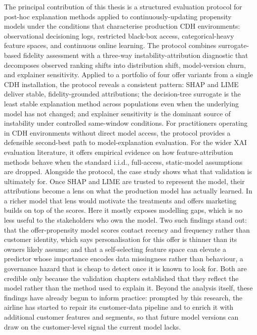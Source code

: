 \documentclass[oneside]{memoir} %
\begin{document}
The principal contribution of this thesis is a structured evaluation protocol for post-hoc explanation methods applied to continuously-updating propensity models under the conditions that characterise production CDH environments: observational decisioning logs, restricted black-box access, categorical-heavy feature spaces, and continuous online learning. The protocol combines surrogate-based fidelity assessment with a three-way instability-attribution diagnostic that decomposes observed ranking shifts into distribution shift, model-version churn, and explainer sensitivity. Applied to a portfolio of four offer variants from a single CDH installation, the protocol reveals a consistent pattern: SHAP and LIME deliver stable, fidelity-grounded attributions; the decision-tree surrogate is the least stable explanation method across populations even when the underlying model has not changed; and explainer sensitivity is the dominant source of instability under controlled same-window conditions. For practitioners operating in CDH environments without direct model access, the protocol provides a defensible second-best path to model-explanation evaluation. For the wider XAI evaluation literature, it offers empirical evidence on how feature-attribution methods behave when the standard i.i.d., full-access, static-model assumptions are dropped. Alongside the protocol, the case study shows what that validation is ultimately for. Once SHAP and LIME are trusted to represent the model, their attributions become a lens on what the production model has actually learned. In a richer model that lens would motivate the treatments and offers marketing builds on top of the scores. Here it mostly exposes modelling gaps, which is no less useful to the stakeholders who own the model. Two such findings stand out: that the offer-propensity model scores contact recency and frequency rather than customer identity, which says personalisation for this offer is thinner than its owners likely assume; and that a self-selecting feature space can elevate a predictor whose importance encodes data missingness rather than behaviour, a governance hazard that is cheap to detect once it is known to look for. Both are credible only because the validation chapters established that they reflect the model rather than the method used to explain it. Beyond the analysis itself, these findings have already begun to inform practice: prompted by this research, the airline has started to repair its customer-data pipeline and to enrich it with additional customer features and segments, so that future model versions can draw on the customer-level signal the current model lacks.
\end{document}
